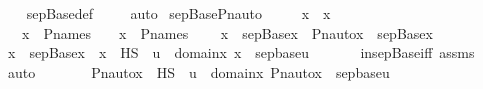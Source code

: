 \begin{isabellebody}
%
\isadelimproof
\ \ %
\endisadelimproof
%
\isatagproof
{}\isamarkupfalse%
\ sep{\isacharunderscore}{\kern0pt}Base{\isacharunderscore}{\kern0pt}def\ \isanewline
\ \ \isamarkupfalse%
\ auto%
\endisatagproof
{\isafoldproof}%
%
\isadelimproof
\isanewline
%
\endisadelimproof
\isanewline
{}\isamarkupfalse%
\ sep{\isacharunderscore}{\kern0pt}Base{\isacharunderscore}{\kern0pt}Pn{\isacharunderscore}{\kern0pt}auto\ {\isacharcolon}{\kern0pt}\ \isanewline
\ \ \ x{}\ {\isasympi}\ x\ \isanewline
\ \ \ {\isachardoublequoteopen}x{}\ {\isasymin}\ P{\isacharunderscore}{\kern0pt}names{\isachardoublequoteclose}\ {\isachardoublequoteopen}{\isasympi}\ {\isasymin}\ {\isasymG}{\isachardoublequoteclose}\ {\isachardoublequoteopen}x\ {\isasymin}\ P{\isacharunderscore}{\kern0pt}names{\isachardoublequoteclose}\ \isanewline
\ \ \ {\isachardoublequoteopen}x\ {\isasymin}\ sep{\isacharunderscore}{\kern0pt}Base{\isacharparenleft}{\kern0pt}x{}{\isacharparenright}{\kern0pt}\ {\isasymlongleftrightarrow}\ Pn{\isacharunderscore}{\kern0pt}auto{\isacharparenleft}{\kern0pt}{\isasympi}{\isacharparenright}{\kern0pt}{\isacharbackquote}{\kern0pt}x\ {\isasymin}\ sep{\isacharunderscore}{\kern0pt}Base{\isacharparenleft}{\kern0pt}x{}{\isacharparenright}{\kern0pt}{\isachardoublequoteclose}\isanewline
%
\isadelimproof
%
\endisadelimproof
%
\isatagproof
{}\isamarkupfalse%
\ {\isacharminus}{\kern0pt}\isanewline
\ \ \isamarkupfalse%
\ {\isachardoublequoteopen}x\ {\isasymin}\ sep{\isacharunderscore}{\kern0pt}Base{\isacharparenleft}{\kern0pt}x{}{\isacharparenright}{\kern0pt}\ {\isasymlongleftrightarrow}\ {\isacharparenleft}{\kern0pt}x\ {\isasymin}\ HS\ {\isasymand}\ {\isacharparenleft}{\kern0pt}{\isasymexists}u\ {\isasymin}\ domain{\isacharparenleft}{\kern0pt}x{}{\isacharparenright}{\kern0pt}{\isachardot}{\kern0pt}\ x\ {\isasymin}\ sep{\isacharunderscore}{\kern0pt}base{\isacharparenleft}{\kern0pt}u{\isacharparenright}{\kern0pt}{\isacharparenright}{\kern0pt}{\isacharparenright}{\kern0pt}{\isachardoublequoteclose}\ \isanewline
\ \ \ \ \isamarkupfalse%
\ in{\isacharunderscore}{\kern0pt}sep{\isacharunderscore}{\kern0pt}Base{\isacharunderscore}{\kern0pt}iff\ assms\ \isamarkupfalse%
\ auto\isanewline
\ \ \isamarkupfalse%
\ \isamarkupfalse%
\ {\isachardoublequoteopen}{\isachardot}{\kern0pt}{\isachardot}{\kern0pt}{\isachardot}{\kern0pt}\ {\isasymlongleftrightarrow}\ {\isacharparenleft}{\kern0pt}Pn{\isacharunderscore}{\kern0pt}auto{\isacharparenleft}{\kern0pt}{\isasympi}{\isacharparenright}{\kern0pt}{\isacharbackquote}{\kern0pt}x\ {\isasymin}\ HS\ {\isasymand}\ {\isacharparenleft}{\kern0pt}{\isasymexists}u\ {\isasymin}\ domain{\isacharparenleft}{\kern0pt}x{}{\isacharparenright}{\kern0pt}{\isachardot}{\kern0pt}\ Pn{\isacharunderscore}{\kern0pt}auto{\isacharparenleft}{\kern0pt}{\isasympi}{\isacharparenright}{\kern0pt}{\isacharbackquote}{\kern0pt}x\ {\isasymin}\ sep{\isacharunderscore}{\kern0pt}base{\isacharparenleft}{\kern0pt}u{\isacharparenright}{\kern0pt}{\isacharparenright}{\kern0pt}{\isacharparenright}{\kern0pt}{\isachardoublequoteclose}\ \isanewline

\end{isabellebody}
